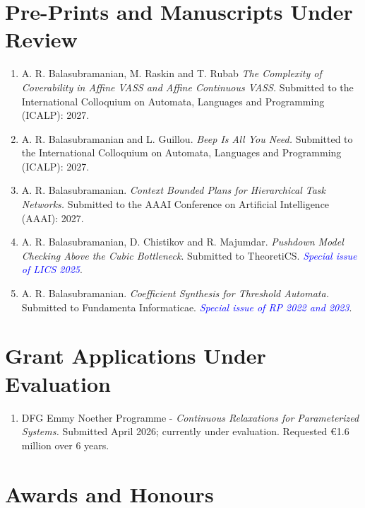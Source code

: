 \documentclass[11pt,a4paper,sans]{moderncv}        %
\begin{document}
\section{Pre-Prints and Manuscripts Under Review}
\begin{enumerate}
	\setlength\itemsep{2pt}
	\item A. R. Balasubramanian, M. Raskin and T. Rubab \textit{The Complexity of Coverability in Affine VASS and Affine Continuous VASS.}  Submitted to the International Colloquium on Automata, Languages and Programming (ICALP): 2027.
	\item A. R. Balasubramanian and L. Guillou. \textit{Beep Is All You Need.}  Submitted to the International Colloquium on Automata, Languages and Programming (ICALP): 2027.
	\item A. R. Balasubramanian. \textit{Context Bounded Plans for Hierarchical Task Networks.} Submitted to the AAAI Conference on Artificial Intelligence (AAAI): 2027.
		\item A. R. Balasubramanian, D. Chistikov and R. Majumdar. 
	\textit{Pushdown Model Checking Above the Cubic Bottleneck}.
	Submitted to TheoretiCS. 
	\textit{\textcolor{blue}{Special issue of LICS 2025}}.
	\item A. R. Balasubramanian. \textit{Coefficient Synthesis for Threshold Automata.} Submitted to Fundamenta Informaticae. \textit{\textcolor{blue}{Special issue of RP 2022 and 2023}}.
\end{enumerate}

\section{Grant Applications Under Evaluation}
\begin{enumerate}
	\setlength\itemsep{2pt}
	\item DFG Emmy Noether Programme - \emph{Continuous Relaxations for Parameterized Systems.} Submitted April 2026; currently under evaluation. Requested €1.6 million over 6 years.
\end{enumerate}


\section{Awards and Honours}

\vspace{2pt}
\end{document}
